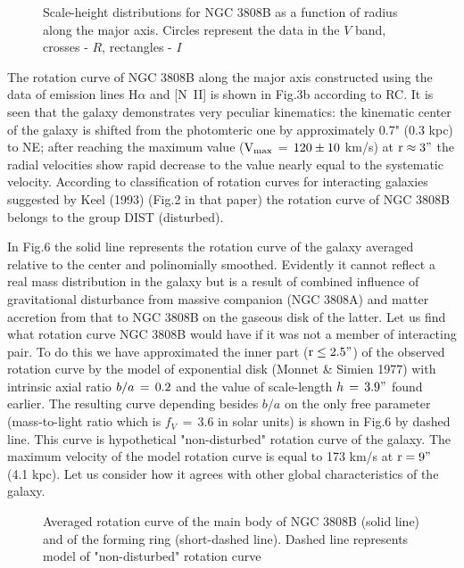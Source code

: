 \begin{figure}
\picplace{1.5cm}
\caption[5]{Scale-height distributions for NGC 3808B as a function of
radius along the major axis. Circles represent the data in the $V$ band,
crosses - $R$, rectangles - $I$}
\end{figure}

The rotation curve of NGC 3808B along
the major axis constructed using the data of emission lines H$\alpha$
and [N~II] is shown in Fig.3b according to RC.
It is seen that the galaxy demonstrates very peculiar
kinematics: the kinematic center of the galaxy is shifted from the
photomteric one by approximately 0.7" (0.3 kpc) to NE; after reaching the
maximum value ($\rm V_{max}\,=\,120\pm10$ km/s) at $\rm r\approx3"$ the
radial velocities show rapid decrease to the value nearly equal to the
systematic velocity. According to classification of rotation curves for
interacting galaxies suggested by Keel (1993) (Fig.2 in that paper) the
rotation curve of NGC 3808B belongs to the group DIST (disturbed).

In Fig.6 the solid line represents the rotation curve of the galaxy
averaged relative to the center and polinomially smoothed. Evidently
it cannot reflect a real mass distribution in the galaxy but is
a result of combined influence of gravitational
disturbance from massive companion (NGC 3808A) and matter accretion
from that to NGC 3808B on the gaseous disk of the latter.
Let us find what rotation curve NGC 3808B would have
if it was not a member of interacting pair. To do this we
have approximated the inner part ($\rm r\leq2.5"$) of the observed
rotation curve by the model of exponential disk (Monnet \& Simien 1977)
with intrinsic axial 
ratio $b/a\,=\rm\,0.2$ and the value of scale-length $h\,=\rm\,3.9"$ 
found earlier. The resulting curve depending
besides $b/a$ on the only free parameter (mass-to-light ratio which is
$f_{V}\,=\,$3.6 in solar units) is shown in Fig.6 by dashed line. 
This curve is hypothetical "non-disturbed" rotation curve of the galaxy.
The maximum velocity of the model rotation curve is equal to 173 km/s
at $\rm r=9"$ (4.1 kpc). Let us consider how it agrees with other 
global characteristics of the galaxy. 

\begin{figure}
\picplace{1.5cm}
\caption[6]{Averaged rotation curve of the main body of NGC 3808B 
(solid line) and of the forming ring (short-dashed line). 
Dashed line represents model of "non-disturbed" rotation curve}
\end{figure}

